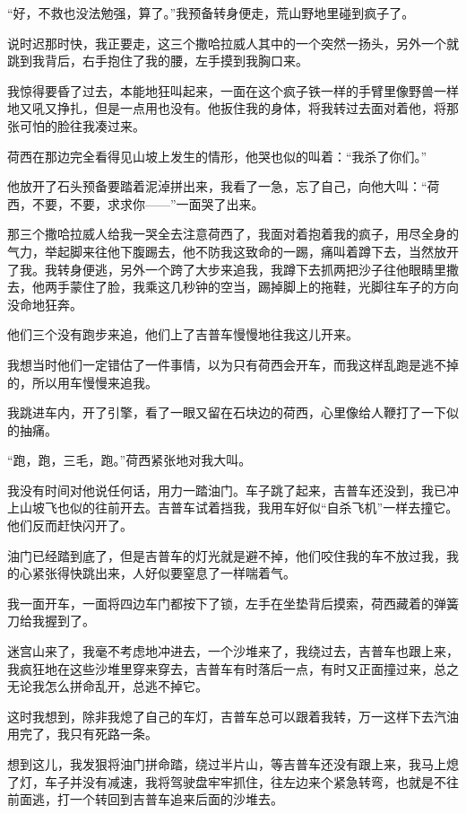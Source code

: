 \par “好，不救也没法勉强，算了。”我预备转身便走，荒山野地里碰到疯子了。
\par 说时迟那时快，我正要走，这三个撒哈拉威人其中的一个突然一扬头，另外一个就跳到我背后，右手抱住了我的腰，左手摸到我胸口来。
\par 我惊得要昏了过去，本能地狂叫起来，一面在这个疯子铁一样的手臂里像野兽一样地又吼又挣扎，但是一点用也没有。他扳住我的身体，将我转过去面对着他，将那张可怕的脸往我凑过来。
\par 荷西在那边完全看得见山坡上发生的情形，他哭也似的叫着：“我杀了你们。”
\par 他放开了石头预备要踏着泥淖拼出来，我看了一急，忘了自己，向他大叫：“荷西，不要，不要，求求你——”一面哭了出来。
\par 那三个撒哈拉威人给我一哭全去注意荷西了，我面对着抱着我的疯子，用尽全身的气力，举起脚来往他下腹踢去，他不防我这致命的一踢，痛叫着蹲下去，当然放开了我。我转身便逃，另外一个跨了大步来追我，我蹲下去抓两把沙子往他眼睛里撒去，他两手蒙住了脸，我乘这几秒钟的空当，踢掉脚上的拖鞋，光脚往车子的方向没命地狂奔。
\par 他们三个没有跑步来追，他们上了吉普车慢慢地往我这儿开来。
\par 我想当时他们一定错估了一件事情，以为只有荷西会开车，而我这样乱跑是逃不掉的，所以用车慢慢来追我。
\par 我跳进车内，开了引擎，看了一眼又留在石块边的荷西，心里像给人鞭打了一下似的抽痛。
\par “跑，跑，三毛，跑。”荷西紧张地对我大叫。
\par 我没有时间对他说任何话，用力一踏油门。车子跳了起来，吉普车还没到，我已冲上山坡飞也似的往前开去。吉普车试着挡我，我用车好似“自杀飞机”一样去撞它。他们反而赶快闪开了。
\par 油门已经踏到底了，但是吉普车的灯光就是避不掉，他们咬住我的车不放过我，我的心紧张得快跳出来，人好似要窒息了一样喘着气。
\par 我一面开车，一面将四边车门都按下了锁，左手在坐垫背后摸索，荷西藏着的弹簧刀给我握到了。
\par 迷宫山来了，我毫不考虑地冲进去，一个沙堆来了，我绕过去，吉普车也跟上来，我疯狂地在这些沙堆里穿来穿去，吉普车有时落后一点，有时又正面撞过来，总之无论我怎么拼命乱开，总逃不掉它。
\par 这时我想到，除非我熄了自己的车灯，吉普车总可以跟着我转，万一这样下去汽油用完了，我只有死路一条。
\par 想到这儿，我发狠将油门拼命踏，绕过半片山，等吉普车还没有跟上来，我马上熄了灯，车子并没有减速，我将驾驶盘牢牢抓住，往左边来个紧急转弯，也就是不往前面逃，打一个转回到吉普车追来后面的沙堆去。
